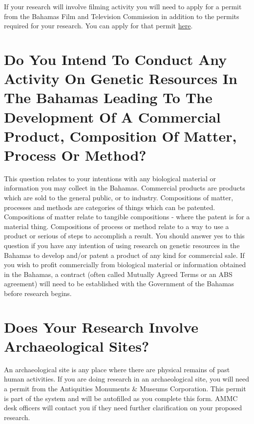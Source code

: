 \documentclass[
]{book}
\begin{document}
If your research will involve filming activity you will need to apply for a permit from the Bahamas Film and Television Commission in addition to the permits required for your research. You can apply for that permit \href{http://www.bahamasfilm.com/Resources/procedures.htm}{here}.

\hypertarget{do-you-intend-to-conduct-any-activity-on-genetic-resources-in-the-bahamas-leading-to-the-development-of-a-commercial-product-composition-of-matter-process-or-method}{%
\section{Do You Intend To Conduct Any Activity On Genetic Resources In The Bahamas Leading To The Development Of A Commercial Product, Composition Of Matter, Process Or Method?}\label{do-you-intend-to-conduct-any-activity-on-genetic-resources-in-the-bahamas-leading-to-the-development-of-a-commercial-product-composition-of-matter-process-or-method}}

This question relates to your intentions with any biological material or information you may collect in the Bahamas. Commercial products are products which are sold to the general public, or to industry. Compositions of matter, processes and methods are categories of things which can be patented. Compositions of matter relate to tangible compositions - where the patent is for a material thing. Compositions of process or method relate to a way to use a product or serious of steps to accomplish a result. You should answer yes to this question if you have any intention of using research on genetic resources in the Bahamas to develop and/or patent a product of any kind for commercial sale. If you wish to profit commercially from biological material or information obtained in the Bahamas, a contract (often called Mutually Agreed Terms or an ABS agreement) will need to be established with the Government of the Bahamas before research begins.

\hypertarget{does-your-research-involve-archaeological-sites}{%
\section{Does Your Research Involve Archaeological Sites?}\label{does-your-research-involve-archaeological-sites}}

An archaeological site is any place where there are physical remains of past human activities. If you are doing research in an archaeological site, you will need a permit from the Antiquities Monuments \& Museums Corporation. This permit is part of the system and will be autofilled as you complete this form. AMMC desk officers will contact you if they need further clarification on your proposed research.
\end{document}
